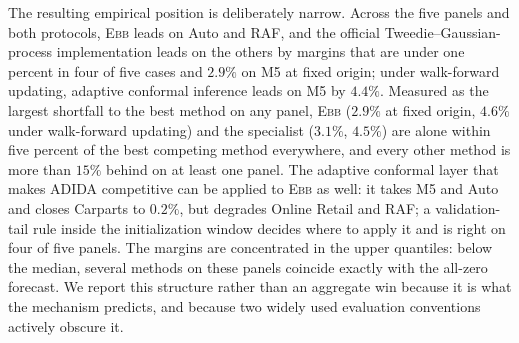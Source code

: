 \documentclass[twocolumn,10pt]{article}
\theoremstyle{definition}
\newcommand{\EBB}{\textsc{Ebb}}
\begin{document}
The resulting empirical position is deliberately narrow. %
Across the five
panels and both protocols, \EBB{} leads on Auto and RAF, and the official
Tweedie--Gaussian-process implementation leads on the others by margins
that are under one percent in four of five cases and $2.9\%$ on M5 at
fixed origin; under walk-forward updating, adaptive conformal inference
leads on M5 by $4.4\%$. Measured as the largest shortfall to the best
method on any panel, \EBB{} ($2.9\%$ at fixed origin, $4.6\%$ under
walk-forward updating) and the specialist ($3.1\%$, $4.5\%$) are alone
within five percent of the best competing method everywhere, and every
other method is more than $15\%$ behind on at least one panel. The
adaptive conformal layer that makes ADIDA competitive can be applied to
\EBB{} as well: it takes M5 and Auto and closes Carparts to $0.2\%$, but
degrades Online Retail and RAF; a validation-tail rule inside the
initialization window decides where to apply it and is right on four of
five panels. The margins are concentrated in the
upper quantiles: below the median, several methods on these panels
coincide exactly with the all-zero forecast. We report this structure rather than an aggregate
win because it is what the mechanism predicts, and because two widely used
evaluation conventions actively obscure it.
\end{document}
